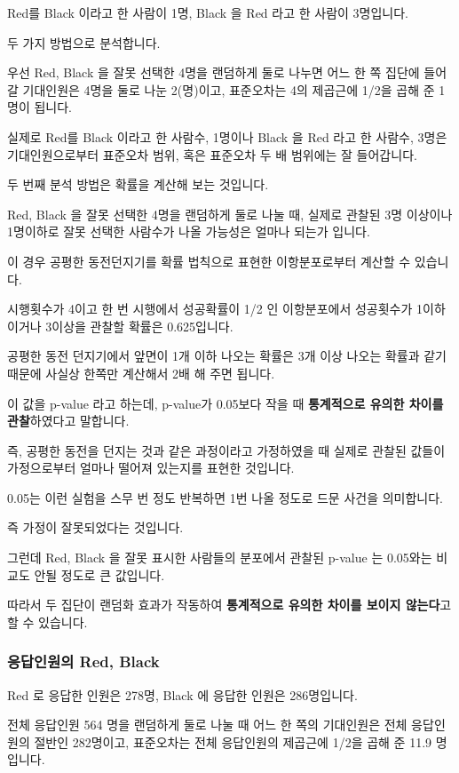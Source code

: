 \documentclass[
]{article}
\begin{document}
Red를 Black 이라고 한 사람이 1명, Black 을 Red 라고 한 사람이 3명입니다.

두 가지 방법으로 분석합니다.

우선 Red, Black 을 잘못 선택한 4명을 랜덤하게 둘로 나누면 어느 한 쪽
집단에 들어갈 기대인원은 4명을 둘로 나눈 2(명)이고, 표준오차는 4의
제곱근에 1/2을 곱해 준 1명이 됩니다.

실제로 Red를 Black 이라고 한 사람수, 1명이나 Black 을 Red 라고 한
사람수, 3명은 기대인원으로부터 표준오차 범위, 혹은 표준오차 두 배
범위에는 잘 들어갑니다.

두 번째 분석 방법은 확률을 계산해 보는 것입니다.

Red, Black 을 잘못 선택한 4명을 랜덤하게 둘로 나눌 때, 실제로 관찰된 3명
이상이나 1명이하로 잘못 선택한 사람수가 나올 가능성은 얼마나 되는가
입니다.

이 경우 공평한 동전던지기를 확률 법칙으로 표현한 이항분포로부터 계산할
수 있습니다.

시행횟수가 4이고 한 번 시행에서 성공확률이 1/2 인 이항분포에서
성공횟수가 1이하이거나 3이상을 관찰할 확률은 0.625입니다.

공평한 동전 던지기에서 앞면이 1개 이하 나오는 확률은 3개 이상 나오는
확률과 같기 때문에 사실상 한쪽만 계산해서 2배 해 주면 됩니다.

이 값을 p-value 라고 하는데, p-value가 0.05보다 작을 때
\textbf{통계적으로 유의한 차이를 관찰}하였다고 말합니다.

즉, 공평한 동전을 던지는 것과 같은 과정이라고 가정하였을 때 실제로
관찰된 값들이 가정으로부터 얼마나 떨어져 있는지를 표현한 것입니다.

0.05는 이런 실험을 스무 번 정도 반복하면 1번 나올 정도로 드문 사건을
의미합니다.

즉 가정이 잘못되었다는 것입니다.

그런데 Red, Black 을 잘못 표시한 사람들의 분포에서 관찰된 p-value 는
0.05와는 비교도 안될 정도로 큰 값입니다.

따라서 두 집단이 랜덤화 효과가 작동하여 \textbf{통계적으로 유의한 차이를
보이지 않는다}고 할 수 있습니다.

\subsubsection{응답인원의 Red,
Black}\label{uxc751uxb2f5uxc778uxc6d0uxc758-red-black}

Red 로 응답한 인원은 278명, Black 에 응답한 인원은 286명입니다.

전체 응답인원 564 명을 랜덤하게 둘로 나눌 때 어느 한 쪽의 기대인원은
전체 응답인원의 절반인 282명이고, 표준오차는 전체 응답인원의 제곱근에
1/2을 곱해 준 11.9 명입니다.
\end{document}
